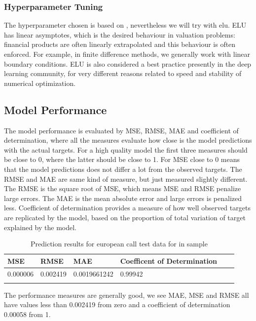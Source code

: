 \subsubsection{Hyperparameter Tuning}
The hyperparameter chosen is based on \parencite{HirsaAli2019}, nevertheless we will try with elu. ELU has linear asymptotes, which is the desired behaviour in valuation problems: financial products are often linearly extrapolated and this behaviour is often enforced. For example, in finite difference methods, we generally work with linear boundary conditions. ELU is also considered a best practice presently in the deep learning community, for very different reasons related to speed and stability of numerical optimization.


\subsection{Model Performance}
The model performance is evaluated by MSE, RMSE, MAE and coefficient of determination, where all the measures evaluate how close is the model predictions with the actual targets. For a high quality model the first three measures should be close to 0, where the latter should be close to 1. For MSE close to 0 means that the model predictions does not differ a lot from the observed targets. The RMSE and MAE are same kind of measure, but just measured slightly different. The RMSE is the square root of MSE, which means MSE and RMSE penalize large errors. The MAE is the mean absolute error and large errors is penalized less. Coefficient of determination provides a measure of how well observed targets are replicated by the model, based on the proportion of total variation of target explained by the model.

\begin{table}[th]
\caption{Prediction results for european call test data for in sample}
\label{tab:euroParRange}
\centering
\begin{tabular}{l l l l l l }
\toprule
\textbf{MSE} & \textbf{RMSE} & \textbf{MAE} & \textbf{Coefficent of Determination} \\
\midrule
0.000006 & 0.002419 & 0.0019661242 & 0.99942\\
\bottomrule\\
\end{tabular}
\end{table}

The performance measures are generally good, we see MAE, MSE and RMSE all have values less than 0.002419 from zero and a coefficient of determination 0.00058 from 1. 

